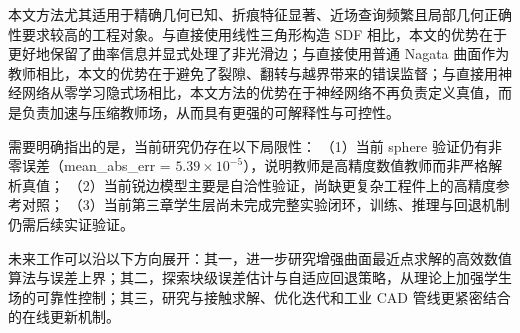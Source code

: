 \documentclass[12pt,oneside]{ctexbook}
\begin{document}
本文方法尤其适用于精确几何已知、折痕特征显著、近场查询频繁且局部几何正确性要求较高的工程对象。与直接使用线性三角形构造 SDF 相比，本文的优势在于更好地保留了曲率信息并显式处理了非光滑边；与直接使用普通 Nagata 曲面作为教师相比，本文的优势在于避免了裂隙、翻转与越界带来的错误监督；与直接用神经网络从零学习隐式场相比，本文方法的优势在于神经网络不再负责定义真值，而是负责加速与压缩教师场，从而具有更强的可解释性与可控性。

需要明确指出的是，当前研究仍存在以下局限性：
（1）当前 sphere 验证仍有非零误差（mean\_abs\_err = $5.39\times10^{-5}$），说明教师是高精度数值教师而非严格解析真值；
（2）当前锐边模型主要是自洽性验证，尚缺更复杂工程件上的高精度参考对照；
（3）当前第三章学生层尚未完成完整实验闭环，训练、推理与回退机制仍需后续实证验证。

未来工作可以沿以下方向展开：其一，进一步研究增强曲面最近点求解的高效数值算法与误差上界；其二，探索块级误差估计与自适应回退策略，从理论上加强学生场的可靠性控制；其三，研究与接触求解、优化迭代和工业 CAD 管线更紧密结合的在线更新机制。

\backmatter
\end{document}
